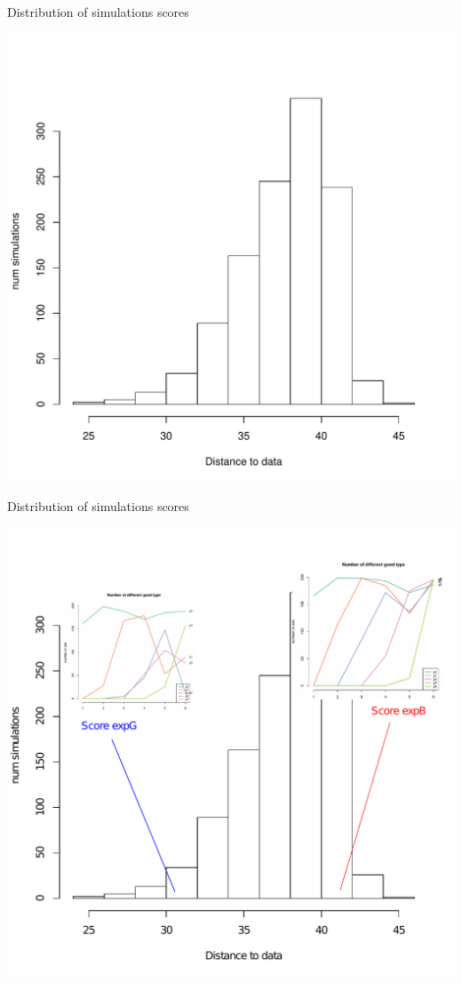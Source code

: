 \documentclass[12pt, notes=show]{beamer}
\begin{document}
\begin{frame}{Distribution of simulations scores}
    \begin{center}
	\includegraphics[width=.65\textwidth]{images/histScore.pdf}\\
    \end{center}
\end{frame}

\begin{frame}{Distribution of simulations scores}
    \begin{center}
	\includegraphics[width=.65\textwidth]{images/histScoreGB.pdf}\\
    \end{center}
\end{frame}
\end{document}
